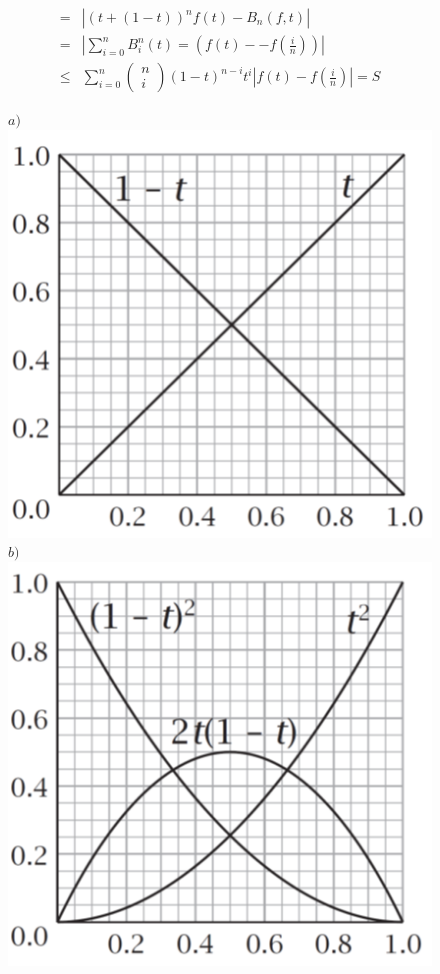 \begin{multicols}{2}
\begin{align*}
		= &|\left(t + (1-t)\right)^nf(t) - B_n(f,t)|\\
		=&\left| {\sum\limits_{i = 0}^n {B_i^n(t)}  = \left( {f(t) -  - f\left( {\frac{i}{n}} \right)} \right)} \right|\\
		\le &\sum\limits_{i = 0}^n {\left( \begin{array}{l}
				n\\
				i
			\end{array} \right){{(1 - t)}^{n - i}}{t^i}} \left| {f(t) - f\left( {\frac{i}{n}} \right)} \right| = S
	\end{align*}
	\begin{figure}[H]
		\vspace*{-5pt}
		\centering
		\captionsetup{labelformat= empty, justification=centering}
		$a)$\includegraphics[width= 0.77\linewidth]{17}
		$b)$\includegraphics[width= 0.77\linewidth]{18}

\end{figure}
\end{multicols}
